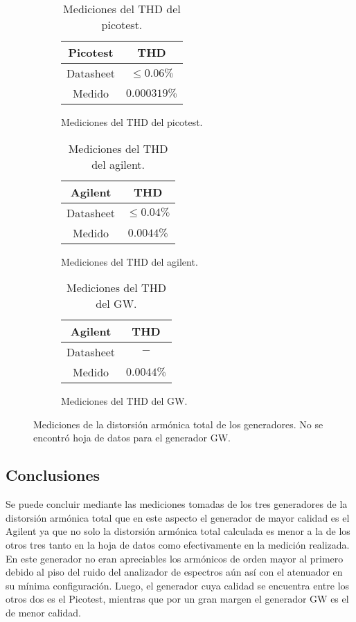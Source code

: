 \begin{figure}[H]
\begin{subfigure}{0.33\textwidth}
\begin{table}[H]
\centering
\begin{tabular}{@{}cc@{}}
\toprule
Picotest & THD\\ \midrule
Datasheet & $\leq 0.06\%$  \\
Medido & $0.000319\%$ \\ \bottomrule
\end{tabular}
\caption{Mediciones del THD del picotest.}
\end{table}
\end{subfigure}
\begin{subfigure}{0.33\textwidth}
\begin{table}[H]
\centering
\begin{tabular}{@{}cc@{}}
\toprule
Agilent & THD \\ \midrule
Datasheet & $\leq 0.04\%$ \\
Medido & $0.0044\%$ \\ \bottomrule
\end{tabular}
\caption{Mediciones del THD del agilent.}
\end{table}
\end{subfigure}
\begin{subfigure}{0.33\textwidth}
\begin{table}[H]
\centering
\begin{tabular}{@{}cc@{}}
\toprule
Agilent & THD \\ \midrule
Datasheet & $-$ \\
Medido & $0.0044\%$ \\ \bottomrule
\end{tabular}
\caption{Mediciones del THD del GW.}
\end{table}
\end{subfigure}
\caption{Mediciones de la distorsión armónica total de los generadores. No se encontró hoja de datos para el generador GW.}
\end{figure}

\subsection{Conclusiones}
Se puede concluir mediante las mediciones tomadas de los tres generadores de la distorsión armónica total que en este aspecto el generador de mayor calidad es el Agilent ya que no solo la distorsión armónica total calculada es menor a la de los otros tres tanto en la hoja de datos como efectivamente en la medición realizada. En este generador no eran apreciables los armónicos de orden mayor al primero debido al piso del ruido del analizador de espectros aún así con el atenuador en su mínima configuración. Luego, el generador cuya calidad se encuentra entre los otros dos es el Picotest, mientras que por un gran margen el generador GW es el de menor calidad.    